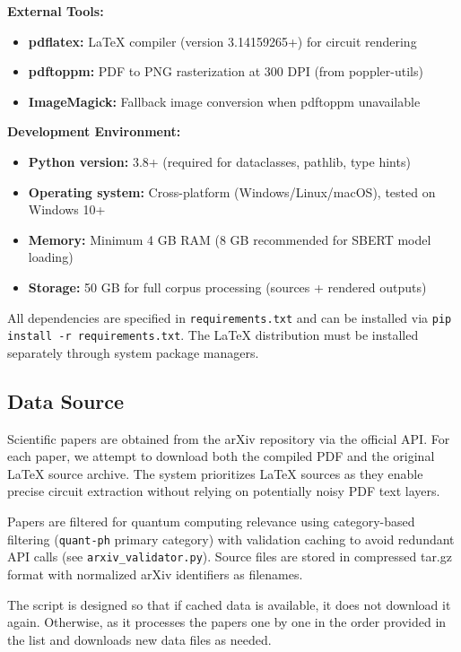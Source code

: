 \documentclass[9pt,a4paper,twoside]{rho-class/rho}
\begin{document}
\textbf{External Tools:}
\begin{itemize}
    \item \textbf{pdflatex:} LaTeX compiler (version 3.14159265+) for circuit rendering
    \item \textbf{pdftoppm:} PDF to PNG rasterization at 300 DPI (from poppler-utils)
    \item \textbf{ImageMagick:} Fallback image conversion when pdftoppm unavailable
\end{itemize}

\textbf{Development Environment:}
\begin{itemize}
    \item \textbf{Python version:} 3.8+ (required for dataclasses, pathlib, type hints)
    \item \textbf{Operating system:} Cross-platform (Windows/Linux/macOS), tested on Windows 10+
    \item \textbf{Memory:} Minimum 4 GB RAM (8 GB recommended for SBERT model loading)
    \item \textbf{Storage:} 50 GB for full corpus processing (sources + rendered outputs)
\end{itemize}

All dependencies are specified in \texttt{requirements.txt} and can be installed via \texttt{pip install -r requirements.txt}. The LaTeX distribution must be installed separately through system package managers.

\subsection{Data Source}

Scientific papers are obtained from the arXiv repository via the official API. For each paper, we attempt to download both the compiled PDF and the original \LaTeX{} source archive. The system prioritizes \LaTeX{} sources as they enable precise circuit extraction without relying on potentially noisy PDF text layers.

Papers are filtered for quantum computing relevance using category-based filtering (\texttt{quant-ph} primary category) with validation caching to avoid redundant API calls (see \texttt{arxiv\_validator.py}). Source files are stored in compressed tar.gz format with normalized arXiv identifiers as filenames.

The script is designed so that if cached data is available, it does not download it again. Otherwise, as it processes the papers one by one in the order provided in the list and downloads new data files as needed.
\end{document}
